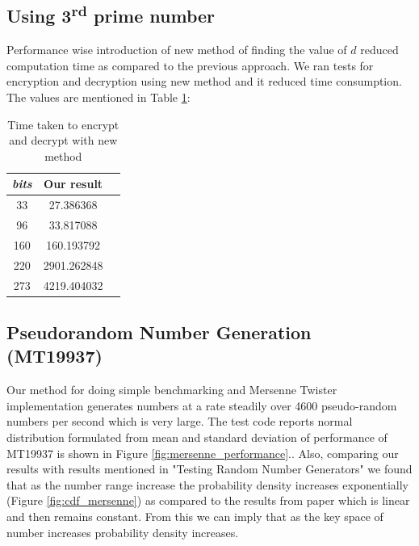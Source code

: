 \documentclass[12pt,journal,compsoc]{IEEEtran}
\begin{document}
\subsection{Using 3\textsuperscript{rd} prime number}
Performance wise introduction of new method of finding the value of $d$ reduced computation time as compared to the previous approach. We ran tests for encryption and decryption using new method and it reduced time consumption. The values are mentioned in Table \ref{table:4.2}:
\begin{table}[ht]
	\begin{center}
	\begin{tabular}{|c|c|c|}
    	\hline
       		\emph{bits}	&		Our result\\
	\hline
    		33			&	27.386368\\
		96			&	33.817088\\
		160			&	160.193792\\
		220			&	2901.262848\\
		273			&	4219.404032\\
	\hline
	\end{tabular}
	\end{center}
	\caption{Time taken to encrypt and decrypt with new method}
	\label{table:4.2}
\end{table}

\subsection{{Pseudorandom Number Generation (MT19937)}}
Our method for doing simple benchmarking and Mersenne Twister implementation generates numbers at a rate steadily over 4600 pseudo-random numbers per second which is very large. The test code reports normal distribution formulated from mean and standard deviation of performance of MT19937 is shown in Figure \ref{fig:mersenne_performance}.\cite{wolfram_mt}. Also, comparing our results with results mentioned in "Testing Random Number Generators"\cite{lcg_cdf} we found that as the number range increase the probability density increases exponentially (Figure \ref{fig:cdf_mersenne}) as compared to the results from paper\cite{lcg_cdf} which is linear and then remains constant. From this we can imply that as the key space of number increases probability density increases.
\end{document}
